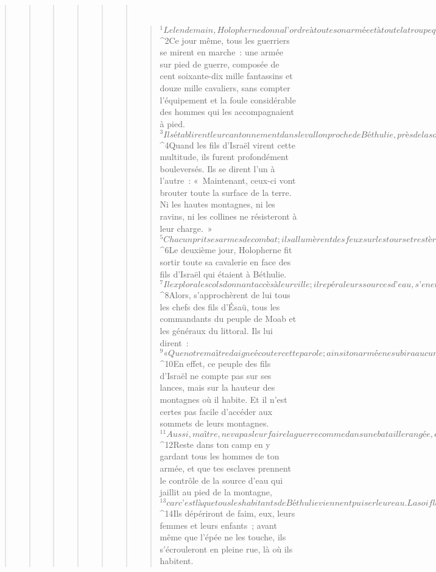 \begin{verse}
\begin{verse}
\begin{verse}
\begin{verse}
\begin{verse}
\begin{verse}
         
      \bchapter{}
      \begin{verse}
${}^{1}Le lendemain, Holopherne donna l’ordre à toute son armée et à toute la troupe qui était venue lui prêter main-forte de se mettre en marche vers Béthulie, de s’emparer des cols de la région montagneuse et d’engager le combat avec les fils d’Israël. 
${}^{2}Ce jour même, tous les guerriers se mirent en marche : une armée sur pied de guerre, composée de cent soixante-dix mille fantassins et douze mille cavaliers, sans compter l’équipement et la foule considérable des hommes qui les accompagnaient à pied. 
${}^{3}Ils établirent leur cantonnement dans le vallon proche de Béthulie, près de la source, et se déployèrent en largeur depuis Dothaïn jusqu’à Belbaïm, et en longueur depuis Béthulie jusqu’à Kyamone, en face d’Esdrelon.
${}^{4}Quand les fils d’Israël virent cette multitude, ils furent profondément bouleversés. Ils se dirent l’un à l’autre : « Maintenant, ceux-ci vont brouter toute la surface de la terre. Ni les hautes montagnes, ni les ravins, ni les collines ne résisteront à leur charge. » 
${}^{5}Chacun prit ses armes de combat ; ils allumèrent des feux sur les tours et restèrent à veiller toute cette nuit-là.
${}^{6}Le deuxième jour, Holopherne fit sortir toute sa cavalerie en face des fils d’Israël qui étaient à Béthulie. 
${}^{7}Il explora les cols donnant accès à leur ville ; il repéra leurs sources d’eau, s’en empara, y laissa des postes d’hommes de guerre, puis retourna lui-même vers sa troupe. 
${}^{8}Alors, s’approchèrent de lui tous les chefs des fils d’Ésaü, tous les commandants du peuple de Moab et les généraux du littoral. Ils lui dirent : 
${}^{9}« Que notre maître daigne écouter cette parole ; ainsi ton armée ne subira aucun dommage. 
${}^{10}En effet, ce peuple des fils d’Israël ne compte pas sur ses lances, mais sur la hauteur des montagnes où il habite. Et il n’est certes pas facile d’accéder aux sommets de leurs montagnes. 
${}^{11}Aussi, maître, ne va pas leur faire la guerre comme dans une bataille rangée, et il ne tombera pas un seul homme de ta troupe. 
${}^{12}Reste dans ton camp en y gardant tous les hommes de ton armée, et que tes esclaves prennent le contrôle de la source d’eau qui jaillit au pied de la montagne, 
${}^{13}car c’est là que tous les habitants de Béthulie viennent puiser leur eau. La soif les affaiblira et ils livreront la ville. Quant à nous et nos troupes, nous monterons sur les sommets des montagnes voisines et nous y installerons des avant-postes, afin que pas un homme ne sorte de la ville. 
${}^{14}Ils dépériront de faim, eux, leurs femmes et leurs enfants ; avant même que l’épée ne les touche, ils s’écrouleront en pleine rue, là où ils habitent. 

\end{verse}
\end{verse}
\end{verse}
\end{verse}
\end{verse}
\end{verse}
\end{verse}
